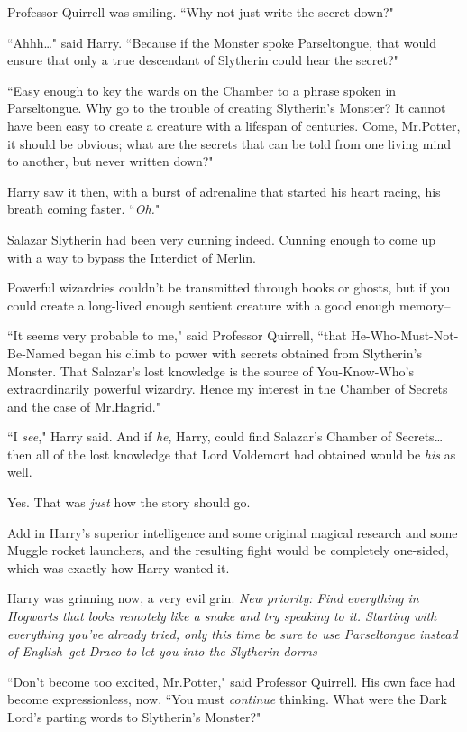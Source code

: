 Professor Quirrell was smiling. ``Why not just write the secret down?"

``Ahhh{\ldots}" said Harry. ``Because if the Monster spoke Parseltongue, that would ensure that only a true descendant of Slytherin could hear the secret?"

``Easy enough to key the wards on the Chamber to a phrase spoken in Parseltongue. Why go to the trouble of creating Slytherin's Monster? It cannot have been easy to create a creature with a lifespan of centuries. Come, Mr.\?Potter, it should be obvious; what are the secrets that can be told from one living mind to another, but never written down?"

Harry saw it then, with a burst of adrenaline that started his heart racing, his breath coming faster. ``\emph{Oh.}"

Salazar Slytherin had been very cunning indeed. Cunning enough to come up with a way to bypass the Interdict of Merlin.

Powerful wizardries couldn't be transmitted through books or ghosts, but if you could create a long-lived enough sentient creature with a good enough memory\---

``It seems very probable to me," said Professor Quirrell, ``that He-Who-Must-Not-Be-Named began his climb to power with secrets obtained from Slytherin's Monster. That Salazar's lost knowledge is the source of You-Know-Who's extraordinarily powerful wizardry. Hence my interest in the Chamber of Secrets and the case of Mr.\?Hagrid."

``I \emph{see}," Harry said. And if \emph{he}, Harry, could find Salazar's Chamber of Secrets{\ldots} then all of the lost knowledge that Lord Voldemort had obtained would be \emph{his} as well.

Yes. That was \emph{just} how the story should go.

Add in Harry's superior intelligence and some original magical research and some Muggle rocket launchers, and the resulting fight would be completely one-sided, which was exactly how Harry wanted it.

Harry was grinning now, a very evil grin. \emph{New priority: Find everything in Hogwarts that looks remotely like a snake and try speaking to it. Starting with everything you've already tried, only this time be sure to use Parseltongue instead of English\---get Draco to let you into the Slytherin dorms\---}

``Don't become too excited, Mr.\?Potter," said Professor Quirrell. His own face had become expressionless, now. ``You must \emph{continue} thinking. What were the Dark Lord's parting words to Slytherin's Monster?"

